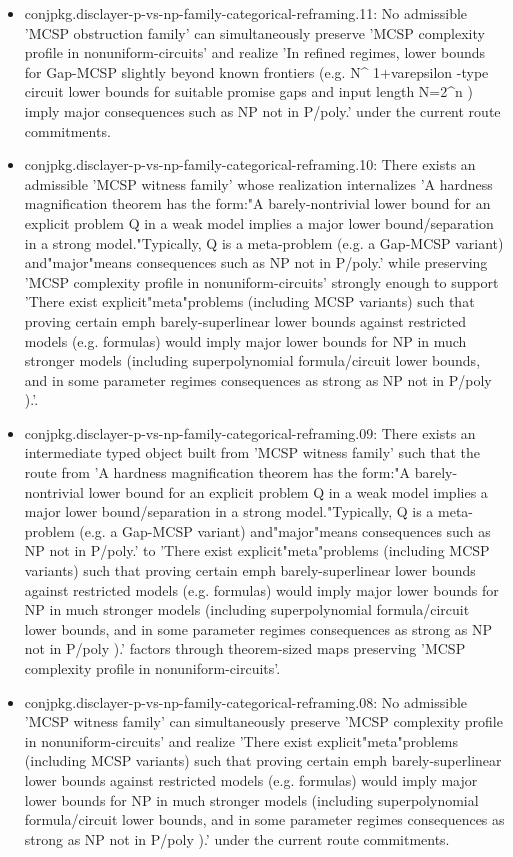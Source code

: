 \documentclass[11pt]{article}
\begin{document}
\begin{itemize}
\item conjpkg.disclayer-p-vs-np-family-categorical-reframing.11: No admissible 'MCSP obstruction family' can simultaneously preserve 'MCSP complexity profile in nonuniform-circuits' and realize 'In refined regimes, lower bounds for Gap-MCSP slightly beyond known frontiers (e.g. N\textasciicircum{} 1+varepsilon -type circuit lower bounds for suitable promise gaps and input length N=2\textasciicircum{}n ) imply major consequences such as NP not in P/poly.' under the current route commitments.
\item conjpkg.disclayer-p-vs-np-family-categorical-reframing.10: There exists an admissible 'MCSP witness family' whose realization internalizes 'A hardness magnification theorem has the form:"A barely-nontrivial lower bound for an explicit problem Q in a weak model implies a major lower bound/separation in a strong model."Typically, Q is a meta-problem (e.g. a Gap-MCSP variant) and"major"means consequences such as NP not in P/poly.' while preserving 'MCSP complexity profile in nonuniform-circuits' strongly enough to support 'There exist explicit"meta"problems (including MCSP variants) such that proving certain emph barely-superlinear lower bounds against restricted models (e.g. formulas) would imply major lower bounds for NP in much stronger models (including superpolynomial formula/circuit lower bounds, and in some parameter regimes consequences as strong as NP not in P/poly ).'.
\item conjpkg.disclayer-p-vs-np-family-categorical-reframing.09: There exists an intermediate typed object built from 'MCSP witness family' such that the route from 'A hardness magnification theorem has the form:"A barely-nontrivial lower bound for an explicit problem Q in a weak model implies a major lower bound/separation in a strong model."Typically, Q is a meta-problem (e.g. a Gap-MCSP variant) and"major"means consequences such as NP not in P/poly.' to 'There exist explicit"meta"problems (including MCSP variants) such that proving certain emph barely-superlinear lower bounds against restricted models (e.g. formulas) would imply major lower bounds for NP in much stronger models (including superpolynomial formula/circuit lower bounds, and in some parameter regimes consequences as strong as NP not in P/poly ).' factors through theorem-sized maps preserving 'MCSP complexity profile in nonuniform-circuits'.
\item conjpkg.disclayer-p-vs-np-family-categorical-reframing.08: No admissible 'MCSP witness family' can simultaneously preserve 'MCSP complexity profile in nonuniform-circuits' and realize 'There exist explicit"meta"problems (including MCSP variants) such that proving certain emph barely-superlinear lower bounds against restricted models (e.g. formulas) would imply major lower bounds for NP in much stronger models (including superpolynomial formula/circuit lower bounds, and in some parameter regimes consequences as strong as NP not in P/poly ).' under the current route commitments.

\end{itemize}
\end{document}
